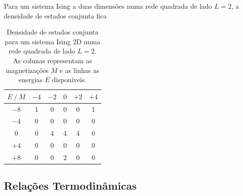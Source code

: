 \documentclass[12pt, a4paper]{article}
\begin{document}
	Para um sistema Ising a duas dimensões numa rede quadrada de lado $L=2$, a densidade de estados conjunta fica
	\begin{table}[h]
	\centering
	\caption{Densidade de estados conjunta para um sistema Ising 2D numa rede quadrada de lado $L=2$. As colunas representam as magnetizações $M$ e as linhas as energias $E$ disponíveis.}
	\label{exact_L2}
	\begin{tabular}{c|ccccc}
	$E \ / \ M$ & $-4$ & $-2$ &  $0$ & $+2$ &  $+4$ \\ \hline
	$-8$  & 1  & 0  & 0 & 0 & 1 \\
	$-4$  & 0  & 0  & 0 & 0 & 0 \\
	$0$   & 0  & 4  & 4 & 4 & 0 \\
	$+4$   & 0  & 0  & 0 & 0 & 0 \\
	$+8$   & 0  & 0  & 2 & 0 & 0
	\end{tabular}
	\end{table}
	

	
		\subsection{Relações Termodinâmicas}
\end{document}
